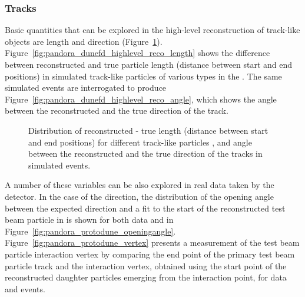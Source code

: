 \subsubsection{Tracks}
\label{sec:Pandora:High:Tracks}

Basic quantities that can be explored in the high-level reconstruction of track-like objects are length and direction (Figure~\ref{fig:pandora_dunefd_highlevel_reco}). Figure~\ref{fig:pandora_dunefd_highlevel_reco_length} shows the difference between reconstructed and true particle length (\threed distance between start and end positions) in simulated track-like particles of various types in the . The same  simulated events are interrogated to produce Figure~\ref{fig:pandora_dunefd_highlevel_reco_angle}, which shows the angle between the reconstructed and the true \threed direction of the track.   

\begin{figure}[!ht]
\centering
\subfloat[]{\label{fig:pandora_dunefd_highlevel_reco_length}
}
\subfloat[]{\label{fig:pandora_dunefd_highlevel_reco_angle}
}
\caption[Distribution of reconstructed-true length for different track-like particles]{Distribution of reconstructed - true length (\threed distance between start and end positions) for different track-like particles \protect{}, and angle between the reconstructed and the true \threed direction of the tracks \protect{} in simulated  events.}
\label{fig:pandora_dunefd_highlevel_reco}
\end{figure}

A number of these variables can be also explored in real data taken by the  detector. In the case of the direction, the distribution of the opening angle between the expected direction and a fit to the start of the reconstructed test beam particle in  is shown for both data and  in Figure~\ref{fig:pandora_protodune_openingangle}.    Figure~\ref{fig:pandora_protodune_vertex} presents a measurement of the test beam particle interaction vertex by comparing the end point of the primary test beam particle track and the interaction vertex, obtained using the start point of the reconstructed daughter particles emerging from the interaction point, for  data and  events. 

